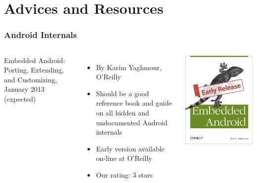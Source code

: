 \section{Advices and Resources}

\begin{frame}
  \frametitle{Android Internals}
  \begin{columns}
    Embedded Android: Porting, Extending, and Customizing, January 2013 (expected)
    \begin{itemize}
    \item By Karim Yaghmour, O'Reilly
    \item Should be a good reference book and guide on all hidden and
      undocumented Android internals
    \item Early version available on-line at O'Reilly
    \item Our rating: 3 stars
    \end{itemize}
    \includegraphics[width=\textwidth]{slides/android-resources/embedded-android.jpg}
  \end{columns}
\end{frame}

